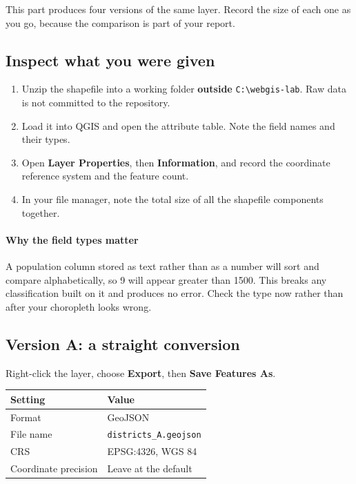 \documentclass{article}
\newcommand{\cd}[1]{\texttt{#1}}
\begin{document}
This part produces four versions of the same layer. Record the size of
each one as you go, because the comparison is part of your report.

\subsection{Inspect what you were given}

\begin{enumerate}
  \item Unzip the shapefile into a working folder \textbf{outside}
        \cd{C:\textbackslash webgis-lab}. Raw data is not committed to
        the repository.
  \item Load it into QGIS and open the attribute table. Note the field
        names and their types.
  \item Open \textbf{Layer Properties}, then \textbf{Information}, and
        record the coordinate reference system and the feature count.
  \item In your file manager, note the total size of all the shapefile
        components together.
\end{enumerate}

\paragraph{Why the field types matter}
A population column stored as text rather than as a number will sort and
compare alphabetically, so 9 will appear greater than 1500. This breaks
any classification built on it and produces no error. Check the type now
rather than after your choropleth looks wrong.


\subsection{Version A: a straight conversion}

Right-click the layer, choose \textbf{Export}, then \textbf{Save
Features As}.

\begin{tabularx}{\textwidth}{@{}L{4.6cm} X@{}}
\toprule
\textbf{Setting} & \textbf{Value} \\
\midrule
Format              & GeoJSON \\
File name           & \cd{districts\_A.geojson} \\
CRS                 & EPSG:4326, WGS 84 \\
Coordinate precision & Leave at the default \\
\bottomrule
\end{tabularx}
\end{document}
